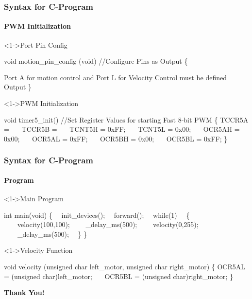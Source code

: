 \documentclass[table,10pt,red]{beamer}	%
\begin{document}
\begin{frame}[shrink = 4,fragile]
\frametitle{Syntax for C-Program} \pause
\framesubtitle{PWM Initialization}
\begin{block}<1->{Port Pin Config}	\pause
\begin{semiverbatim}
\scriptsize{
void motion_pin_config (void) \color{green} //Configure Pins as Output\color{black}
\{

Port A for motion control and Port L for Velocity Control must be defined Output
\} }
\end{semiverbatim}
\end{block} \pause
\begin{block}<1->{PWM Initialization}	\pause
\begin{semiverbatim}
\scriptsize{
void timer5_init()	\color{green} //Set Register Values for starting Fast 8-bit PWM  \color{black}
\{
TCCR5A =  
\ \ \	TCCR5B =
\ \ \	TCNT5H = 0xFF; 
\ \ \	TCNT5L = 0x00; 
\ \ \	OCR5AH = 0x00;
\ \ \ OCR5AL = 0xFF;
\ \ \	OCR5BH = 0x00;
\ \ \ OCR5BL = 0xFF;
\} }
\end{semiverbatim}
\end{block} 
\end{frame}
\begin{frame}[shrink = 2,fragile]
\frametitle{Syntax for C-Program} \pause
\framesubtitle{Program}
\begin{block}<1->{Main Program}	\pause
\begin{semiverbatim}
\scriptsize{
int main(void)
\{
\ \		init_devices(); 
\ \		forward();
\ \		while(1)
\ \		\{
\ \ \ \			velocity(100,100);
\ \ \ \			_delay_ms(500);
\ \ \ \			velocity(0,255);
\ \ \ \			_delay_ms(500);
\ \		\}
\}
}
\end{semiverbatim}
\end{block} \pause
\begin{block}<1->{Velocity Function}	\pause
\begin{semiverbatim}
\scriptsize{
void velocity (unsigned char left_motor, unsigned char right_motor)	
\{
OCR5AL = (unsigned char)left_motor;
\ \ \	OCR5BL = (unsigned char)right_motor;
\}} 
\end{semiverbatim}
\end{block} 
\end{frame}
\begin{frame}
	\centering
	\vspace{2cm}	
	\textbf{\Huge Thank You!} \\[60pt]
\end{frame}
\end{document}
